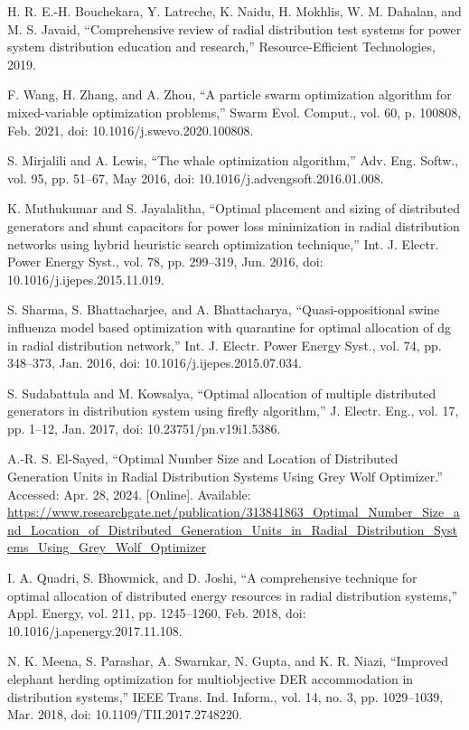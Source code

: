 \documentclass[conference]{IEEEtran}
\begin{document}
\begin{thebibliography}{00}
 H. R. E.-H. Bouchekara, Y. Latreche, K. Naidu, H. Mokhlis, W. M. Dahalan, and M. S. Javaid, “Comprehensive review of radial distribution test systems for power system distribution education and research,” Resource-Efficient Technologies, 2019.

 F. Wang, H. Zhang, and A. Zhou, “A particle swarm optimization algorithm for mixed-variable optimization problems,” Swarm Evol. Comput., vol. 60, p. 100808, Feb. 2021, doi: 10.1016/j.swevo.2020.100808.

 S. Mirjalili and A. Lewis, “The whale optimization algorithm,” Adv. Eng. Softw., vol. 95, pp. 51–67, May 2016, doi: 10.1016/j.advengsoft.2016.01.008.

 K. Muthukumar and S. Jayalalitha, “Optimal placement and sizing of distributed generators and shunt capacitors for power loss minimization in radial distribution networks using hybrid heuristic search optimization technique,” Int. J. Electr. Power Energy Syst., vol. 78, pp. 299–319, Jun. 2016, doi: 10.1016/j.ijepes.2015.11.019.

 S. Sharma, S. Bhattacharjee, and A. Bhattacharya, “Quasi-oppositional swine influenza model based optimization with quarantine for optimal allocation of dg in radial distribution network,” Int. J. Electr. Power Energy Syst., vol. 74, pp. 348–373, Jan. 2016, doi: 10.1016/j.ijepes.2015.07.034.

 S. Sudabattula and M. Kowsalya, “Optimal allocation of multiple distributed generators in distribution system using firefly algorithm,” J. Electr. Eng., vol. 17, pp. 1–12, Jan. 2017, doi: 10.23751/pn.v19i1.5386.

 A.-R. S. El-Sayed, “Optimal Number Size and Location of Distributed Generation Units in Radial Distribution Systems Using Grey Wolf Optimizer.” Accessed: Apr. 28, 2024. [Online]. Available: \url{https://www.researchgate.net/publication/313841863_Optimal_Number_Size_and_Location_of_Distributed_Generation_Units_in_Radial_Distribution_Systems_Using_Grey_Wolf_Optimizer}

 I. A. Quadri, S. Bhowmick, and D. Joshi, “A comprehensive technique for optimal allocation of distributed energy resources in radial distribution systems,” Appl. Energy, vol. 211, pp. 1245–1260, Feb. 2018, doi: 10.1016/j.apenergy.2017.11.108.

 N. K. Meena, S. Parashar, A. Swarnkar, N. Gupta, and K. R. Niazi, “Improved elephant herding optimization for multiobjective DER accommodation in distribution systems,” IEEE Trans. Ind. Inform., vol. 14, no. 3, pp. 1029–1039, Mar. 2018, doi: 10.1109/TII.2017.2748220.


\end{thebibliography}
\end{document}
